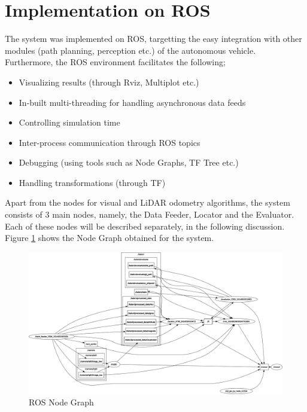 \section{Implementation on \acrlong{ROS}}
The system was implemented on \gls{ROS}, targetting the easy integration with other modules (path planning, perception etc.) of the autonomous vehicle. Furthermore, the \gls{ROS} environment facilitates the following;
\begin{itemize}
	\item Visualizing results (through Rviz, Multiplot etc.)
	\item In-built multi-threading for handling asynchronous data feeds
	\item Controlling simulation time
	\item Inter-process communication through \gls{ROS} topics
	\item Debugging (using tools such as Node Graphs, TF Tree etc.)
	\item Handling transformations (through TF)
\end{itemize}
Apart from the nodes for visual and \gls{LiDAR} odometry algorithms, the system consists of 3 main nodes, namely, the Data Feeder, Locator and the Evaluator. Each of these nodes will be described separately, in the following discussion. Figure \ref{fig:pa:nodeGraph} shows the Node Graph obtained for the system.

\begin{figure}[h]
	\begin{center}
	\includegraphics[width=\textwidth]{figs/rosgraph.png}
	\end{center}
	\vspace{-0.5cm}
	\caption[\gls{ROS} Node Graph]{\gls{ROS} Node Graph}
	\label{fig:pa:nodeGraph}
	\vspace{0.5cm}
\end{figure}

